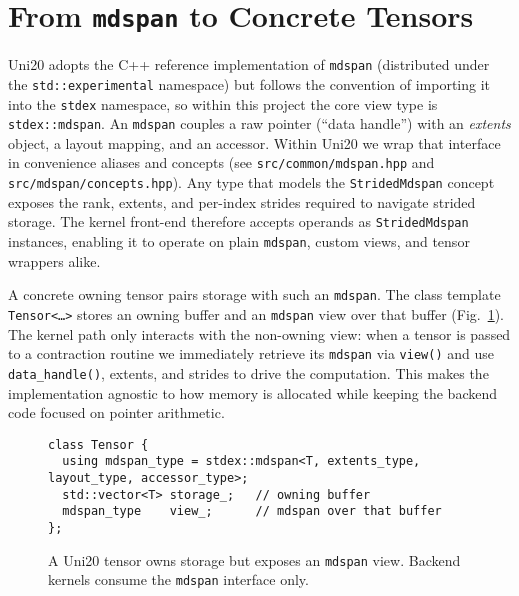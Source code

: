 \documentclass[11pt]{article}
\begin{document}
\section{From \texttt{mdspan} to Concrete Tensors}
Uni20 adopts the C++ reference implementation of \texttt{mdspan} (distributed under the
\texttt{std::experimental} namespace) but follows the convention of importing it into the
\texttt{stdex} namespace, so within this project the core view type is \texttt{stdex::mdspan}.  An
\texttt{mdspan} couples a
raw pointer (``data handle'') with an \emph{extents} object, a layout mapping, and an accessor.
Within Uni20 we wrap that interface in convenience aliases and concepts (see
\texttt{src/common/mdspan.hpp} and \texttt{src/mdspan/concepts.hpp}).  Any type that models the
\texttt{StridedMdspan} concept exposes the rank, extents, and per-index strides required to navigate
strided storage.  The kernel front-end therefore accepts operands as \texttt{StridedMdspan}
instances, enabling it to operate on plain \texttt{mdspan}, custom views, and tensor wrappers alike.

A concrete owning tensor pairs storage with such an \texttt{mdspan}.  The class template
\texttt{Tensor<\ldots>} stores an owning buffer and an \texttt{mdspan} view over that buffer
(Fig.~\ref{fig:tensor-mdspan}).  The kernel path only interacts with the non-owning view: when a
tensor is passed to a contraction routine we immediately retrieve its \texttt{mdspan} via
\texttt{view()} and use \texttt{data\_handle()}, extents, and strides to drive the computation.
This makes the implementation agnostic to how memory is allocated while keeping the backend code
focused on pointer arithmetic.

\begin{figure}[h]
  \centering
  \begin{minipage}{0.9\linewidth}
    \begin{lstlisting}
class Tensor {
  using mdspan_type = stdex::mdspan<T, extents_type, layout_type, accessor_type>;
  std::vector<T> storage_;   // owning buffer
  mdspan_type    view_;      // mdspan over that buffer
};
    \end{lstlisting}
  \end{minipage}
  \caption{A Uni20 tensor owns storage but exposes an \texttt{mdspan} view.  Backend kernels consume
  the \texttt{mdspan} interface only.}
  \label{fig:tensor-mdspan}
\end{figure}
\end{document}

